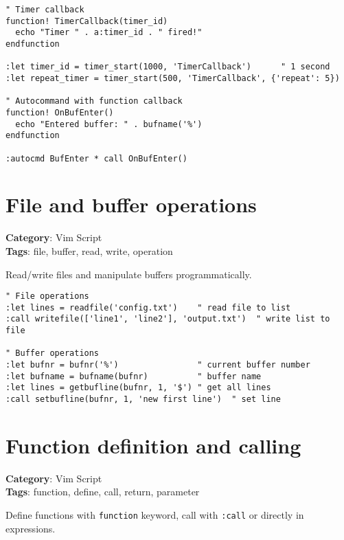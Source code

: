 {{{{{{{{{{{{{{{{{{{\begin{Exa*}{}
\begin{Verbatim}[fontsize=\footnotesize, breaklines, breakanywhere]
" Timer callback
function! TimerCallback(timer_id)
  echo "Timer " . a:timer_id . " fired!"
endfunction

:let timer_id = timer_start(1000, 'TimerCallback')      " 1 second
:let repeat_timer = timer_start(500, 'TimerCallback', {'repeat': 5})

" Autocommand with function callback
function! OnBufEnter()
  echo "Entered buffer: " . bufname('%')
endfunction

:autocmd BufEnter * call OnBufEnter()
\end{Verbatim}
\end{Exa*}

\section{File and buffer operations}

\textbf{Category}: Vim Script\\ \textbf{Tags}: file, buffer, read, write, operation
\vspace{0.5cm}

Read/write files and manipulate buffers programmatically.

\begin{Exa*}{}
\begin{Verbatim}[fontsize=\footnotesize, breaklines, breakanywhere]
" File operations
:let lines = readfile('config.txt')    " read file to list
:call writefile(['line1', 'line2'], 'output.txt')  " write list to file

" Buffer operations
:let bufnr = bufnr('%')                " current buffer number
:let bufname = bufname(bufnr)          " buffer name
:let lines = getbufline(bufnr, 1, '$') " get all lines
:call setbufline(bufnr, 1, 'new first line')  " set line
\end{Verbatim}
\end{Exa*}

\section{Function definition and calling}

\textbf{Category}: Vim Script\\ \textbf{Tags}: function, define, call, return, parameter
\vspace{0.5cm}

Define functions with {\footnotesize \Verb§function§} keyword, call with {\footnotesize \Verb§:call§} or directly in expressions.

}}}}}}}}}}}}}}}}}}}

